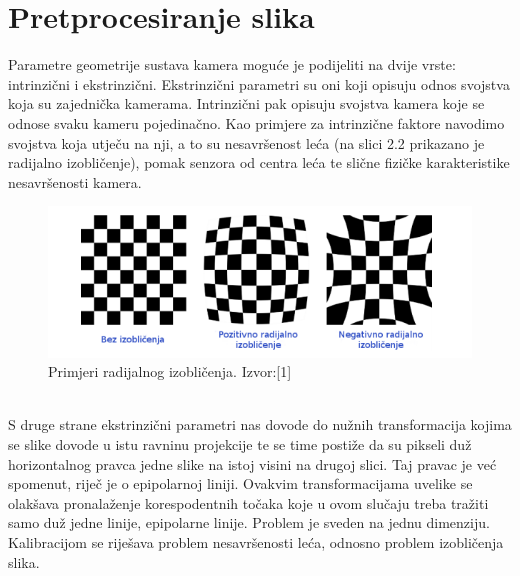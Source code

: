 \documentclass[times, utf8, zavrsni]{fer}
\begin{document}
\section{Pretprocesiranje slika}
Parametre geometrije sustava kamera moguće je  podijeliti na dvije vrste: intrinzični i ekstrinzični. Ekstrinzični parametri su oni koji opisuju odnos svojstva koja su zajednička kamerama. Intrinzični pak opisuju svojstva kamera koje se odnose svaku kameru pojedinačno. Kao primjere za intrinzične faktore navodimo svojstva koja utječu na nji, a to su nesavršenost leća (na slici 2.2 prikazano je radijalno izobličenje), pomak senzora od centra leća te slične fizičke karakteristike nesavršenosti kamera.\\
\begin{figure}[htb]
\centering
\includegraphics[scale=0.7]{img/slika2.png}
\caption{Primjeri radijalnog izobličenja. Izvor:[1]}
\label{fig:Radial}
\end{figure}\\
S druge strane ekstrinzični parametri nas dovode do nužnih transformacija kojima se slike dovode u istu ravninu projekcije te se time postiže da su pikseli duž horizontalnog pravca jedne slike na istoj visini na drugoj slici. Taj pravac je već spomenut, riječ je o epipolarnoj liniji. Ovakvim transformacijama uvelike se olakšava pronalaženje korespodentnih točaka koje u ovom slučaju treba tražiti samo duž jedne linije, epipolarne linije. Problem je sveden na jednu dimenziju. Kalibracijom se riješava problem nesavršenosti leća, odnosno problem izobličenja slika.\\
\\
\end{document}
